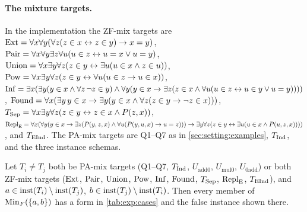 \paragraph{The mixture targets.}
In the implementation the ZF-mix targets are $\mathrm{Ext}=\forall x\forall y(\forall z(z\in x\leftrightarrow z\in y)\to x=y)$, $\mathrm{Pair}=\forall x\forall y\exists z\forall u(u\in z\leftrightarrow u=x\vee u=y)$, $\mathrm{Union}=\forall x\exists y\forall z(z\in y\leftrightarrow\exists u(u\in x\wedge z\in u))$, $\mathrm{Pow}=\forall x\exists y\forall z(z\in y\leftrightarrow\forall u(u\in z\to u\in x))$, $\mathrm{Inf}=\exists x(\exists y(y\in x\wedge\forall z\,\neg z\in y)\wedge\forall y(y\in x\to\exists z(z\in x\wedge\forall u(u\in z\leftrightarrow u\in y\vee u=y))))$, $\mathrm{Found}=\forall x(\exists y\,y\in x\to\exists y(y\in x\wedge\forall z(z\in y\to\neg z\in x)))$, $T_{\mathrm{Sep}}=\forall x\exists y\forall z(z\in y\leftrightarrow z\in x\wedge P(z,x))$, $\mathrm{Repl}_{\mathrm{E}}=\forall x(\forall y(y\in x\to\exists z(P(y,z,x)\wedge\forall u(P(y,u,x)\to u=z)))\to\exists y\forall z(z\in y\leftrightarrow\exists u(u\in x\wedge P(u,z,x))))$, and $T_{\mathrm{EInd}}$. The PA-mix targets are Q1--Q7 as in \cref{sec:setting:examples}, $T_{\mathrm{Ind}}$, and the three instance schemas.

\begin{proposition}\label{prop:exp:mixsep}
Let $T_i\neq T_j$ both be PA-mix targets (Q1--Q7, $T_{\mathrm{Ind}}$, $U_{\mathrm{add0}}$, $U_{\mathrm{mul0}}$, $U_{\mathrm{0add}}$) or both ZF-mix targets ($\mathrm{Ext}$, $\mathrm{Pair}$, $\mathrm{Union}$, $\mathrm{Pow}$, $\mathrm{Inf}$, $\mathrm{Found}$, $T_{\mathrm{Sep}}$, $\mathrm{Repl}_{\mathrm{E}}$, $T_{\mathrm{EInd}}$), and $a\in\mathrm{inst}(T_i)\setminus\mathrm{inst}(T_j)$, $b\in\mathrm{inst}(T_j)\setminus\mathrm{inst}(T_i)$. Then every member of $\mathrm{Min}_F(\{a,b\})$ has a form in \cref{tab:exp:cases} and the false instance shown there.
\end{proposition}

